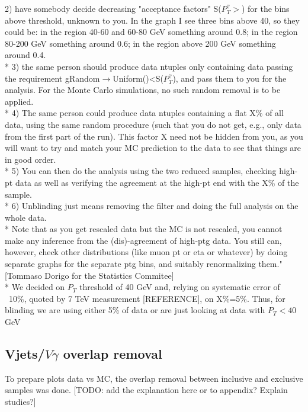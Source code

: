2) have somebody decide decreasing "acceptance factors" S($P_T^{\gamma}>$) for the bins above threshold, unknown to you. In the graph I see three bins above 40, so they could be: in the region 40-60 and 60-80 GeV something around 0.8; in the region 80-200 GeV something around 0.6; in the region above 200 GeV something around 0.4.\\*
3) the same person should produce data ntuples only containing data passing the requirement gRandom$\rightarrow$Uniform()<S($P_T^{\gamma}$), and pass them to you for the analysis. For the Monte Carlo simulations, no such random removal is to be applied.\\*
4) The same person could produce data ntuples containing a flat X\% of all data, using the same random procedure (such that you do not get, e.g., only data from the first part of the run). This factor X need not be hidden from you, as you will want to try and match your MC prediction to the data to see that things are in good order.\\*
5) You can then do the analysis using the two reduced samples, checking high-pt data as well as verifying the agreement at the high-pt end with the X\% of the sample.\\*
6) Unblinding just means removing the filter and doing the full analysis on the whole data.\\*
Note that as you get rescaled data but the MC is not rescaled, you cannot make any inference from the (dis)-agreement of high-ptg data. You still can, however, check other distributions (like muon pt or eta or whatever) by doing separate graphs for the separate ptg bins, and suitably renormalizing them." [Tommaso Dorigo for the Statistics Commitee]\\*
We decided on $P_T$ threshold of 40 GeV and, relying on systematic error of ~10\%, quoted by 7 TeV measurement [REFERENCE], on X\%=5\%. Thus, for blinding we are using either 5\% of data or are just looking at data with $P_T<40$ GeV

\subsection{Vjets/$V\gamma$ overlap removal}
To prepare plots data vs MC, the overlap removal between inclusive and exclusive samples was done. 
[TODO: add the explanation here or to appendix? Explain studies?]

